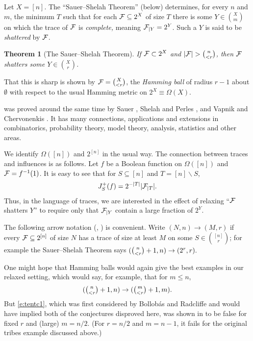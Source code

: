 \documentclass{toc}
\newtheorem{thm}{Theorem}[section]
\newcommand{\nin}[0]{\noindent}
\newcommand{\sub}[0]{\subseteq}
\newcommand{\f}[0]{{\cal F}}
\newcommand{\0}[0]{\emptyset}
\newcommand{\Cc}[0]{\tbinom}
\newcommand{\gO}[0]{\Omega}
\begin{document}
Let $X = [n]$.
%
The ``Sauer--Shelah Theorem'' (below)
determines, for every $n$ and $m$, the minimum $T$
such that for each $\f\sub 2^X$ of size $T$ there is some
$Y \in \binom{X}{m}$ on which the trace of $\f$ is \emph{complete,}
meaning ${\cal F}_{|Y}=2^Y$. Such a $Y$
is said to be \emph{shattered} by ${\cal F}$.

\begin {thm}[The Sauer--Shelah Theorem]
\label {t:sas}
If ${\cal F} \subset 2^{X}$ and
$|\f| > \binom{n}{< r} $,
%
then $\f$ shatters some $Y\in \binom{X}{r}$.
\end {thm}

\nin
That this is sharp is shown by
${\cal F} = \binom{X}{< r}$, the \emph{Hamming ball}
of radius $r-1$ about
$\0$ with respect to the usual Hamming metric on
$2^{X}\equiv \gO(X)$.

 was proved
around the same time by Sauer \cite {Sa},
Shelah and Perles \cite{Sh}, and Vapnik and Chervonenkis \cite {VC}.
%
It has many connections, applications and extensions
in combinatorics, probability theory, model theory, analysis, statistics
and other areas.
%

We identify $\gO([n])$ and $2^{[n]}$ in the usual way.
The connection between traces and influences is as follows.
Let $f$ be a Boolean function on $\gO([n])$
and
${\cal F} =f^{-1}(1)$.
It is easy to see
that for
$S\sub [n]$ and $T = [n] \backslash S$,
$$J^+_S(f)=2^{-|T|}|{\cal F}_{|T}| .$$
Thus, in the language of traces, we are interested in
the effect of relaxing ``$\f$ shatters $Y$''
to require only that
${\cal F}_{|Y}$ contain a large fraction of $2^Y$.

The following arrow notation
(\eg, \cite {Bo,Fr,AMS19}) is convenient.  Write
$(N,n) \to (M,r)$ if every $\f\sub 2^{[n]}$
of size %
$N$   %
has a trace of size at least $M$ on some
$S \in \binom{[n]}{r}$; for example the Sauer--Shelah Theorem
says $(\Cc{n}{< r}+1,n) \to (2^r,r).$


\medskip
One might hope that Hamming balls would again give the
best examples in our relaxed setting, which would say, for example,
that for $m \le n$,
\begin {equation}
\label{e:tentc1}
(\Cc{n}{< r}+1,n) \to (\Cc{m}{< r}+1,m).
\end {equation}
But \eqref{e:tentc1}, which was first considered by
Bollob\'as and Radcliffe \cite{BR}
and would have implied both of the conjectures
disproved here,
was shown in \cite{BR} to be false
for fixed $r$ and (large) $m=n/2$.
(For $r=n/2$
and $m=n-1$, it fails for the original tribes example
discussed above.)
\end{document}
